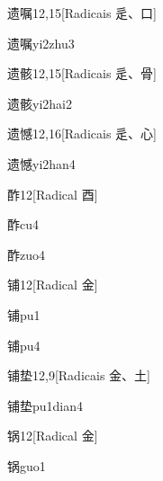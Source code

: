 \begin{entry}{遗嘱}{12,15}[Radicais ⾡、⼝]
  \begin{phonetics}{遗嘱}{yi2zhu3}
  \end{phonetics}
\end{entry}

\begin{entry}{遗骸}{12,15}[Radicais ⾡、⾻]
  \begin{phonetics}{遗骸}{yi2hai2}
  \end{phonetics}
\end{entry}

\begin{entry}{遗憾}{12,16}[Radicais ⾡、⼼]
  \begin{phonetics}{遗憾}{yi2han4}
  \end{phonetics}
\end{entry}

\begin{entry}{酢}{12}[Radical ⾣]
  \begin{phonetics}{酢}{cu4}
  \end{phonetics}
  \begin{phonetics}{酢}{zuo4}
  \end{phonetics}
\end{entry}

\begin{entry}{铺}{12}[Radical ⾦]
  \begin{phonetics}{铺}{pu1}
  \end{phonetics}
  \begin{phonetics}{铺}{pu4}
  \end{phonetics}
\end{entry}

\begin{entry}{铺垫}{12,9}[Radicais ⾦、⼟]
  \begin{phonetics}{铺垫}{pu1dian4}
  \end{phonetics}
\end{entry}

\begin{entry}{锅}{12}[Radical ⾦]
  \begin{phonetics}{锅}{guo1}
  \end{phonetics}
\end{entry}

